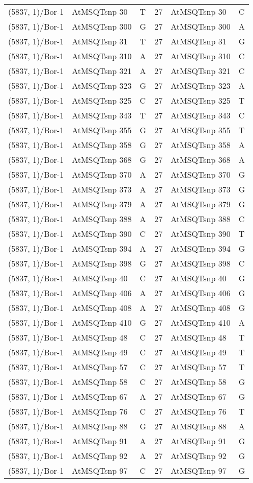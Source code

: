 \begin{center}
\begin{longtable}{|l|l|l|l|l|l|}
(5837, 1)/Bor-1&AtMSQTsnp 30&T&27&AtMSQTsnp 30&C\\
(5837, 1)/Bor-1&AtMSQTsnp 300&G&27&AtMSQTsnp 300&A\\
(5837, 1)/Bor-1&AtMSQTsnp 31&T&27&AtMSQTsnp 31&G\\
(5837, 1)/Bor-1&AtMSQTsnp 310&A&27&AtMSQTsnp 310&C\\
(5837, 1)/Bor-1&AtMSQTsnp 321&A&27&AtMSQTsnp 321&C\\
(5837, 1)/Bor-1&AtMSQTsnp 323&G&27&AtMSQTsnp 323&A\\
(5837, 1)/Bor-1&AtMSQTsnp 325&C&27&AtMSQTsnp 325&T\\
(5837, 1)/Bor-1&AtMSQTsnp 343&T&27&AtMSQTsnp 343&C\\
(5837, 1)/Bor-1&AtMSQTsnp 355&G&27&AtMSQTsnp 355&T\\
(5837, 1)/Bor-1&AtMSQTsnp 358&G&27&AtMSQTsnp 358&A\\
(5837, 1)/Bor-1&AtMSQTsnp 368&G&27&AtMSQTsnp 368&A\\
(5837, 1)/Bor-1&AtMSQTsnp 370&A&27&AtMSQTsnp 370&G\\
(5837, 1)/Bor-1&AtMSQTsnp 373&A&27&AtMSQTsnp 373&G\\
(5837, 1)/Bor-1&AtMSQTsnp 379&A&27&AtMSQTsnp 379&G\\
(5837, 1)/Bor-1&AtMSQTsnp 388&A&27&AtMSQTsnp 388&C\\
(5837, 1)/Bor-1&AtMSQTsnp 390&C&27&AtMSQTsnp 390&T\\
(5837, 1)/Bor-1&AtMSQTsnp 394&A&27&AtMSQTsnp 394&G\\
(5837, 1)/Bor-1&AtMSQTsnp 398&G&27&AtMSQTsnp 398&C\\
(5837, 1)/Bor-1&AtMSQTsnp 40&C&27&AtMSQTsnp 40&G\\
(5837, 1)/Bor-1&AtMSQTsnp 406&A&27&AtMSQTsnp 406&G\\
(5837, 1)/Bor-1&AtMSQTsnp 408&A&27&AtMSQTsnp 408&G\\
(5837, 1)/Bor-1&AtMSQTsnp 410&G&27&AtMSQTsnp 410&A\\
(5837, 1)/Bor-1&AtMSQTsnp 48&C&27&AtMSQTsnp 48&T\\
(5837, 1)/Bor-1&AtMSQTsnp 49&C&27&AtMSQTsnp 49&T\\
(5837, 1)/Bor-1&AtMSQTsnp 57&C&27&AtMSQTsnp 57&T\\
(5837, 1)/Bor-1&AtMSQTsnp 58&C&27&AtMSQTsnp 58&G\\
(5837, 1)/Bor-1&AtMSQTsnp 67&A&27&AtMSQTsnp 67&G\\
(5837, 1)/Bor-1&AtMSQTsnp 76&C&27&AtMSQTsnp 76&T\\
(5837, 1)/Bor-1&AtMSQTsnp 88&G&27&AtMSQTsnp 88&A\\
(5837, 1)/Bor-1&AtMSQTsnp 91&A&27&AtMSQTsnp 91&G\\
(5837, 1)/Bor-1&AtMSQTsnp 92&A&27&AtMSQTsnp 92&G\\
(5837, 1)/Bor-1&AtMSQTsnp 97&C&27&AtMSQTsnp 97&G\\
\hline
\end{longtable}
\end{center}

